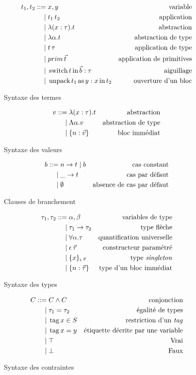 \begin{figure}
\begin{align*}
  t_1, t_2 ::=& \; x, y 
    & \text{variable}
  \\ |& \;      t_1 \, t_2
    & \text{application}
  \\ |& \;      \lambda (x : \tau) . t
    & \text{abstraction}
  \\ |& \;      \lambda \alpha . t
    & \text{abstraction de type}
  \\ |& \;      t \, \tau
    & \text{application de type}
  \\ |& \;      prim \, \vec{t}
    & \text{application de primitives}
  \\ |& \;      \operatorname{switch} t \operatorname{in} \vec{b} : \tau
    & \text{aiguillage}
  \\ |& \;      \operatorname{unpack} t_1 \operatorname{as} y : x \operatorname{in} t_2
    & \text{ouverture d'un bloc}
\end{align*}
\caption{Syntaxe des termes}
\end{figure}

\begin{figure}
\begin{align*}
  v ::=& \;     \lambda (x : \tau) . t
    & \text{abstraction}
  \\ |& \;      \Lambda \alpha . v
    & \text{abstraction de type}
  \\ |& \;      \{ n: \vec{v} \}
    & \text{bloc immédiat}
\end{align*}
\caption{Syntaxe des valeurs}
\end{figure}

\begin{figure}
\begin{align*}
  b ::=& \; n \rightarrow t \; | \; b
    & \text{cas constant}
  \\ |& \;  \_ \rightarrow t
    & \text{cas par défaut}
  \\ |& \;  \emptyset
    & \text{absence de cas par défaut}
\end{align*}
\caption{Clauses de branchement}
\end{figure}

\begin{figure}
\begin{align*}
  \tau_1, \tau_2 ::=& \; \alpha, \beta
    & \text{variables de type}
  \\ |& \;  \tau_1 \rightarrow \tau_2
    & \text{type flèche}
  \\ |& \;  \forall \alpha. \tau
    & \text{quantification universelle}
  \\ |& \;  \epsilon \, \vec{\tau}
    & \text{constructeur paramétré}
    \\ |& \;  \{ x \}_{\epsilon \, \vec{\tau}}
    & \text{type \emph{singleton}}
  \\ |& \;  \{ n: \vec{\tau} \}
    & \text{type d'un bloc immédiat}
\end{align*}
\caption{Syntaxe des types}
\end{figure}

\begin{figure}
\begin{align*}
  C ::=& \; C \wedge C
    & \text{conjonction}
  \\ |& \;  \tau_1 = \tau_2
    & \text{égalité de types}
  \\ |& \;  \operatorname{tag} x \in S
    & \text{restriction d'un \emph{tag}}
  \\ |& \;  \operatorname{tag} x = y
    & \text{étiquette décrite par une variable}
  \\ |& \;  \top
    & \text{Vrai}
  \\ |& \;  \bot
    & \text{Faux}
\end{align*}
\caption{Syntaxe des contraintes}
\end{figure}

